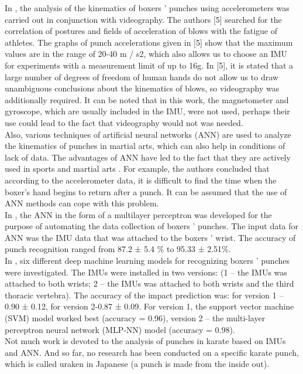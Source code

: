 \documentclass[sport,article,submit,moreauthors,pdftex]{Definitions/mdpi}
\begin{document}
In \cite{ref-journal5}, the analysis of the kinematics of boxers ' punches using accelerometers was carried out in conjunction with videography. The authors [5] searched for the correlation of postures and fields of acceleration of blows with the fatigue of athletes. The graphs of punch accelerations given in [5] show that the maximum values are in the range of 20-40 m / s2, which also allows us to choose an IMU for experiments with a measurement limit of up to 16g. In [5], it is stated that a large number of degrees of freedom of human hands do not allow us to draw unambiguous conclusions about the kinematics of blows, so videography was additionally required. It can be noted that in this work, the magnetometer and gyroscope, which are usually included in the IMU, were not used, perhaps their use could lead to the fact that videography would not was needed.\\
Also, various techniques of artificial neural networks (ANN) are used to analyze the kinematics of punches in martial arts, which can also help in conditions of lack of data. The advantages of ANN have led to the fact that they are actively used in sports and martial arts \cite{ref-journal6}. For example, the authors \cite{ref-journal3} concluded that according to the accelerometer data, it is difficult to find the time when the boxer's hand begins to return after a punch. It can be assumed that the use of ANN methods can cope with this problem.\\
In \cite{ref-journal7}, the ANN in the form of a multilayer perceptron was developed for the purpose of automating the data collection of boxers ' punches. The input data for ANN was the IMU data that was attached to the boxers ' wrist. The accuracy of punch recognition ranged from 87.2 ± 5.4 \% to 95.33 ± 2.51\%.\\
In \cite{ref-journal8}, six different deep machine learning models for recognizing boxers ' punches were investigated. The IMUs were installed in two versions: (1 – the IMUs was attached to both wrists; 2 – the IMUs was attached to both wrists and the third thoracic vertebra). The accuracy of the impact prediction was: for version 1 – 0.90 ± 0.12, for version 2-0.87 ± 0.09. For version 1, the support vector machine (SVM) model worked best (accuracy = 0.96), version 2 – the multi-layer perceptron neural network (MLP-NN) model (accuracy = 0.98).\\
Not much work is devoted to the analysis of punches in karate based on IMUs and ANN. And so far, no research has been conducted on a specific karate punch, which is called uraken in Japanese (a punch is made from the inside out).
\end{document}
